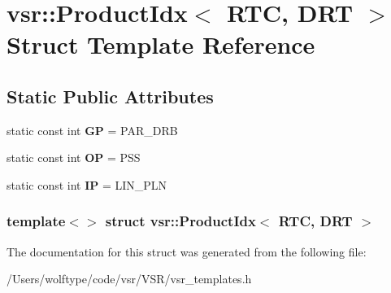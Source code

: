 \hypertarget{structvsr_1_1_product_idx_3_01_r_t_c_00_01_d_r_t_01_4}{\section{vsr\-:\-:Product\-Idx$<$ R\-T\-C, D\-R\-T $>$ Struct Template Reference}
\label{structvsr_1_1_product_idx_3_01_r_t_c_00_01_d_r_t_01_4}
}
\subsection*{Static Public Attributes}
\begin{DoxyCompactItemize}
\item 
\hypertarget{structvsr_1_1_product_idx_3_01_r_t_c_00_01_d_r_t_01_4_a4a928c1b099518814c8753d8bc4b6fed}{static const int {\bfseries G\-P} = P\-A\-R\-\_\-\-D\-R\-B}\label{structvsr_1_1_product_idx_3_01_r_t_c_00_01_d_r_t_01_4_a4a928c1b099518814c8753d8bc4b6fed}

\item 
\hypertarget{structvsr_1_1_product_idx_3_01_r_t_c_00_01_d_r_t_01_4_a3b1fc458b89746b832acb00038a6407e}{static const int {\bfseries O\-P} = P\-S\-S}\label{structvsr_1_1_product_idx_3_01_r_t_c_00_01_d_r_t_01_4_a3b1fc458b89746b832acb00038a6407e}

\item 
\hypertarget{structvsr_1_1_product_idx_3_01_r_t_c_00_01_d_r_t_01_4_a9a0b90ebf3a0f01c8035d5bb5ec797da}{static const int {\bfseries I\-P} = L\-I\-N\-\_\-\-P\-L\-N}\label{structvsr_1_1_product_idx_3_01_r_t_c_00_01_d_r_t_01_4_a9a0b90ebf3a0f01c8035d5bb5ec797da}

\end{DoxyCompactItemize}
\subsubsection*{template$<$$>$ struct vsr\-::\-Product\-Idx$<$ R\-T\-C, D\-R\-T $>$}



The documentation for this struct was generated from the following file\-:\begin{DoxyCompactItemize}
\item 
/\-Users/wolftype/code/vsr/\-V\-S\-R/vsr\-\_\-templates.\-h\end{DoxyCompactItemize}
